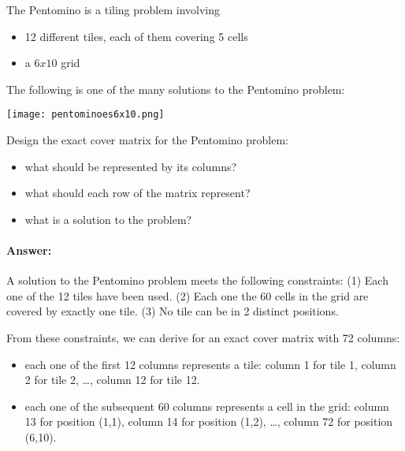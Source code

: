 \documentclass[table]{article}
\begin{document}
The Pentomino is a tiling problem involving
\begin{itemize}
\item 12 different tiles, each of them covering 5 cells
\item a $6x10$ grid
\end{itemize}

The following is one of the many solutions to the Pentomino problem:
\vspace{1em}

\begin{center}
\texttt{[image: pentominoes6x10.png]}
\end{center}

\vspace{1em}

Design the exact cover matrix for the Pentomino problem:
\begin{itemize}
	\item what should be represented by its columns?
	\item what should each row of the matrix represent?
	\item what is a solution to the problem?
\end{itemize}

\paragraph{Answer:} A solution to the Pentomino problem meets the following constraints:
	(1) Each one of the 12 tiles have been used.
	(2) Each one the 60 cells in the grid are covered by exactly one tile.
	(3) No tile can be in 2 distinct positions.

From these constraints, we can derive for an exact cover matrix with 72 columns:
\begin{itemize}
	\item each one of the first 12 columns represents a tile: column 1 for tile 1, column 2 for tile 2, \ldots, column 12 for tile 12.
	\item each one of the subsequent 60 columns represents a cell in the grid: column 13 for position (1,1), column 14 for position (1,2), \ldots, column 72 for position (6,10).
\end{itemize}
\end{document}
